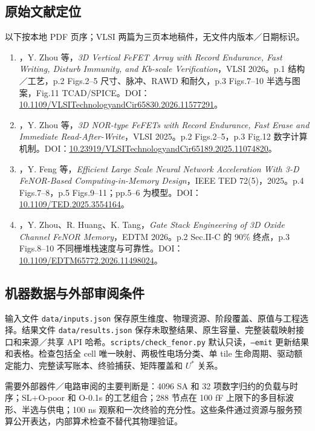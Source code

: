 \subsection{原始文献定位}
以下按本地 PDF 页序；VLSI 两篇为三页本地稿件，无文件内版本／日期标识。
\begin{enumerate}
\item {}，Y. Zhou 等，\emph{3D Vertical FeFET Array with Record Endurance, Fast Writing, Disturb Immunity, and Kb-scale Verification}，VLSI 2026。p.1 结构／工艺，p.2 Figs.2--5 尺寸、脉冲、RAWD 和耐久，p.3 Figs.7--10 半选与图案，Fig.11 TCAD/SPICE。DOI：\href{https://doi.org/10.1109/VLSITechnologyandCir65830.2026.11577291}{10.1109/VLSITechnologyandCir65830.2026.11577291}。
\item {}，Y. Zhou 等，\emph{3D NOR-type FeFETs with Record Endurance, Fast Erase and Immediate Read-After-Write}，VLSI 2025。p.2 Figs.2--5，p.3 Fig.12 数字计算机制。DOI：\href{https://doi.org/10.23919/VLSITechnologyandCir65189.2025.11074820}{10.23919/VLSITechnologyandCir65189.2025.11074820}。
\item {}，Y. Feng 等，\emph{Efficient Large Scale Neural Network Acceleration With 3-D FeNOR-Based Computing-in-Memory Design}，IEEE TED 72(5)，2025。p.4 Figs.7--8，p.5 Figs.9--11；pp.5--6 为模型。DOI：\href{https://doi.org/10.1109/TED.2025.3554164}{10.1109/TED.2025.3554164}。
\item {}，Y. Zhou、R. Huang、K. Tang，\emph{Gate Stack Engineering of 3D Oxide Channel FeNOR Memory}，EDTM 2026。p.2 Sec.II-C 的 90\% 终点，p.3 Figs.8--10 不同栅堆栈速度与可靠性。DOI：\href{https://doi.org/10.1109/EDTM65772.2026.11498024}{10.1109/EDTM65772.2026.11498024}。
\end{enumerate}

\subsection{机器数据与外部审阅条件}
输入文件 \texttt{data/inputs.json} 保存原生维度、物理资源、阶段覆盖、原值与工程选择。结果文件 \texttt{data/results.json} 保存未取整结果、原生容量、完整装载映射接口和来源／共享 API 哈希。\texttt{scripts/check\_fenor.py} 默认只读，\texttt{--emit} 更新结果和表格。检查包括全 cell 唯一映射、两极性电场分类、单 tile 生命周期、驱动额定能力、完整读写账本、终验捕获、矩阵覆盖和 $U^*$ 关系。

需要外部器件／电路审阅的主要判断是：4096 SA 和 32 项数字归约的负载与时序；SL+O-poor 和 O-0.1s 的工艺组合；288 节点在 100 fF 上限下的多目标波形、半选与供电；100 ns 观察和一次终验的充分性。这些条件通过资源与服务预算公开表达，内部算术检查不替代其物理验证。
